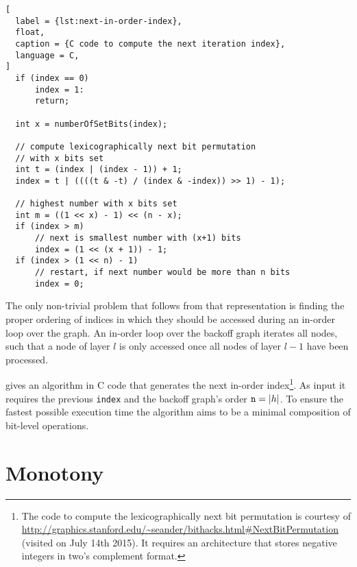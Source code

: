 \begin{lstlisting}[
  label = {lst:next-in-order-index},
  float,
  caption = {C code to compute the next iteration index},
  language = C,
]
  if (index == 0)
      index = 1:
      return;

  int x = numberOfSetBits(index);

  // compute lexicographically next bit permutation
  // with x bits set
  int t = (index | (index - 1)) + 1;
  index = t | ((((t & -t) / (index & -index)) >> 1) - 1);

  // highest number with x bits set
  int m = ((1 << x) - 1) << (n - x);
  if (index > m)
      // next is smallest number with (x+1) bits
      index = (1 << (x + 1)) - 1;
  if (index > (1 << n) - 1)
      // restart, if next number would be more than n bits
      index = 0;
\end{lstlisting}

The only non-trivial problem that follows from that representation is finding
the proper ordering of indices in which they should be accessed during an
in-order loop over the graph.
An in-order loop over the backoff graph iterates all nodes, such that a node
of layer $l$ is only accessed once all nodes of layer $l-1$ have been processed.

 gives an algorithm in C code that generates the
next in-order index\footnote{The code to compute the lexicographically next bit
permutation is courtesy of
\mbox{\url{http://graphics.stanford.edu/~seander/bithacks.html\#NextBitPermutation}}
(visited on July 14th 2015).
It requires an architecture that stores negative integers in two's complement
format.}.
As input it requires the previous \texttt{index} and the backoff graph's order
$\texttt{n} = {\left|h\right|}$.
To ensure the fastest possible execution time the algorithm aims to be a minimal
composition of bit-level operations.

\section{Monotony}

